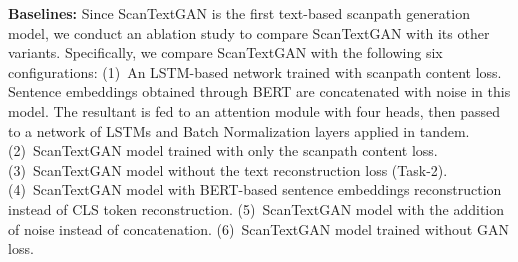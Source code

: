 \textbf{Baselines:} Since ScanTextGAN is the first text-based scanpath generation model, we conduct an ablation study to compare ScanTextGAN with its other variants. Specifically, we compare ScanTextGAN with the following six configurations: (1)~An LSTM-based network trained with scanpath content loss. Sentence embeddings obtained through BERT are concatenated with noise in this model. The resultant is fed to an attention module with four heads, then passed to a network of LSTMs and Batch Normalization layers applied in tandem. (2)~ScanTextGAN model trained with only the scanpath content loss. (3)~ScanTextGAN model without the text reconstruction loss (Task-2). (4)~ScanTextGAN model with BERT-based sentence embeddings reconstruction instead of CLS token reconstruction. (5)~ScanTextGAN model with the addition of noise instead of concatenation. (6)~ScanTextGAN model trained without GAN loss.



